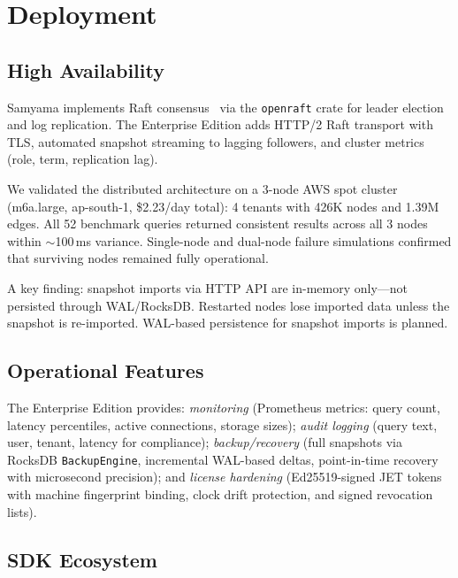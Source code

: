 \documentclass[sigconf, nonacm]{acmart}
\begin{document}
\section{Deployment}
\label{sec:deployment}

\subsection{High Availability}

Samyama implements Raft consensus~\cite{ongaro2014raft} via the \texttt{openraft} crate for leader election and log replication.
The Enterprise Edition adds HTTP/2 Raft transport with TLS, automated snapshot streaming to lagging followers, and cluster metrics (role, term, replication lag).

We validated the distributed architecture on a 3-node AWS spot cluster (m6a.large, ap-south-1, \$2.23/day total):
4 tenants with 426K nodes and 1.39M edges.
All 52 benchmark queries returned consistent results across all 3 nodes within ${\sim}$100\,ms variance.
Single-node and dual-node failure simulations confirmed that surviving nodes remained fully operational.

A key finding: snapshot imports via HTTP API are in-memory only---not persisted through WAL/RocksDB.
Restarted nodes lose imported data unless the snapshot is re-imported.
WAL-based persistence for snapshot imports is planned.

\subsection{Operational Features}

The Enterprise Edition provides:
\emph{monitoring} (Prometheus metrics: query count, latency percentiles, active connections, storage sizes);
\emph{audit logging} (query text, user, tenant, latency for compliance);
\emph{backup/recovery} (full snapshots via RocksDB \texttt{BackupEngine}, incremental WAL-based deltas, point-in-time recovery with microsecond precision);
and \emph{license hardening} (Ed25519-signed JET tokens with machine fingerprint binding, clock drift protection, and signed revocation lists).

\subsection{SDK Ecosystem}
\end{document}
